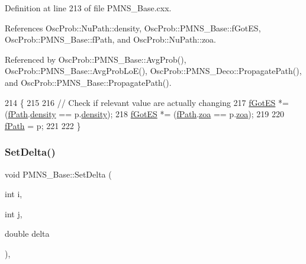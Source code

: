 Definition at line 213 of file P\+M\+N\+S\+\_\+\+Base.\+cxx.



References Osc\+Prob\+::\+Nu\+Path\+::density, Osc\+Prob\+::\+P\+M\+N\+S\+\_\+\+Base\+::f\+Got\+ES, Osc\+Prob\+::\+P\+M\+N\+S\+\_\+\+Base\+::f\+Path, and Osc\+Prob\+::\+Nu\+Path\+::zoa.



Referenced by Osc\+Prob\+::\+P\+M\+N\+S\+\_\+\+Base\+::\+Avg\+Prob(), Osc\+Prob\+::\+P\+M\+N\+S\+\_\+\+Base\+::\+Avg\+Prob\+Lo\+E(), Osc\+Prob\+::\+P\+M\+N\+S\+\_\+\+Deco\+::\+Propagate\+Path(), and Osc\+Prob\+::\+P\+M\+N\+S\+\_\+\+Base\+::\+Propagate\+Path().


\begin{DoxyCode}
214 \{
215 
216   \textcolor{comment}{// Check if relevant value are actually changing}
217   \hyperlink{classOscProb_1_1PMNS__Base_a6dc5cd010d2d70b2324745b4e53e9839}{fGotES} *= (\hyperlink{classOscProb_1_1PMNS__Base_a849437aa8891fe042e86886ce8f81c6e}{fPath}.\hyperlink{structOscProb_1_1NuPath_a54ddd451db69bc54434de3cf18a117ca}{density} == p.\hyperlink{structOscProb_1_1NuPath_a54ddd451db69bc54434de3cf18a117ca}{density});
218   \hyperlink{classOscProb_1_1PMNS__Base_a6dc5cd010d2d70b2324745b4e53e9839}{fGotES} *= (\hyperlink{classOscProb_1_1PMNS__Base_a849437aa8891fe042e86886ce8f81c6e}{fPath}.\hyperlink{structOscProb_1_1NuPath_af3213f3691ba83c6bc05f4a3490f6b31}{zoa} == p.\hyperlink{structOscProb_1_1NuPath_af3213f3691ba83c6bc05f4a3490f6b31}{zoa});
219 
220   \hyperlink{classOscProb_1_1PMNS__Base_a849437aa8891fe042e86886ce8f81c6e}{fPath} = p;
221 
222 \}
\end{DoxyCode}
\mbox{\label{classOscProb_1_1PMNS__Base_a4bef78cfcfc4e70b4ce79cdb8862c0a3}} 
\subsubsection{\texorpdfstring{Set\+Delta()}{SetDelta()}}
{\footnotesize\ttfamily void P\+M\+N\+S\+\_\+\+Base\+::\+Set\+Delta (\begin{DoxyParamCaption}\item[{int}]{i,  }\item[{int}]{j,  }\item[{double}]{delta }\end{DoxyParamCaption})\hspace{0.3cm}{\ttfamily [virtual]}, {\ttfamily [inherited]}}

